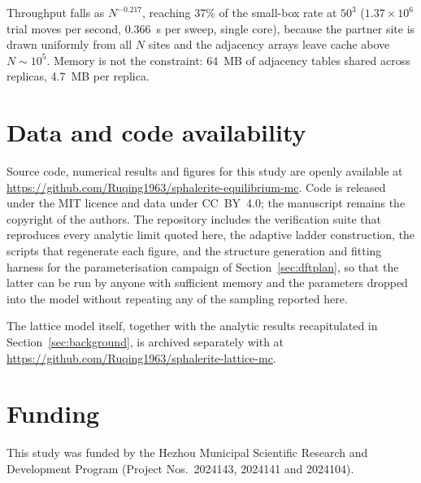 \documentclass[11pt,a4paper]{article}
\begin{document}
Throughput falls as $N^{-0.217}$, reaching 37\% of the small-box rate at $50^3$
($1.37\times10^6$ trial moves per second, 0.366~s per sweep, single core),
because the partner site is drawn uniformly from all $N$ sites and the adjacency
arrays leave cache above $N \sim 10^5$. Memory is not the constraint: 64~MB of
adjacency tables shared across replicas, 4.7~MB per replica.

\section*{Data and code availability}
\label{sec:availability}
Source code, numerical results and figures for this study are openly available
at \url{https://github.com/Ruqing1963/sphalerite-equilibrium-mc}. Code is
released under the MIT licence and data under CC~BY~4.0; the manuscript remains
the copyright of the authors. The repository includes the verification suite
that reproduces every analytic limit quoted here, the adaptive ladder
construction, the scripts that regenerate each figure, and the structure
generation and fitting harness for the parameterisation campaign of
Section~\ref{sec:dftplan}, so that the latter can be run by anyone with
sufficient memory and the parameters dropped into the model without repeating
any of the sampling reported here.

The lattice model itself, together with the analytic results recapitulated in
Section~\ref{sec:background}, is archived separately with
\citet{yu2026} at \url{https://github.com/Ruqing1963/sphalerite-lattice-mc}.

\section*{Funding}
This study was funded by the Hezhou Municipal Scientific Research and
Development Program (Project Nos.\ 2024143, 2024141 and 2024104).
\end{document}
